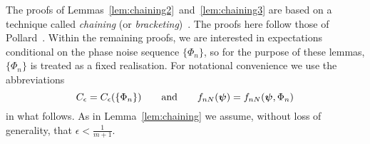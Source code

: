 \documentclass[journal]{IEEEtran}
\begin{document}
The proofs of Lemmas~\ref{lem:chaining2}~and~\ref{lem:chaining3} are based on a technique called \emph{chaining} (or \emph{bracketing})~\cite{Dudley_unif_central_lim_th_1999,Ossiander_clt_bracketing_1984,Pollard_asymp_empi_proc_1989,Pollard_new_ways_clts_1986}.  The proofs here follow those of Pollard~\cite[Section 3]{Pollard_asymp_empi_proc_1989}.  Within the remaining proofs, we are interested in expectations conditional on the phase noise sequence $\{\Phi_n\}$, so for the purpose of these lemmas, $\{\Phi_n\}$ is treated as a fixed realisation.  For notational convenience we use the abbreviations 
\[
C_\epsilon = C_\epsilon(\{\Phi_n\}) \qquad \text{and} \qquad f_{nN}(\boldsymbol{\psi}) = f_{nN}(\boldsymbol{\psi}, \Phi_n)
\]
in what follows.  As in Lemma~\ref{lem:chaining} we assume, without loss of generality, that $\epsilon < \tfrac{1}{m+1}$.  %
\end{document}
